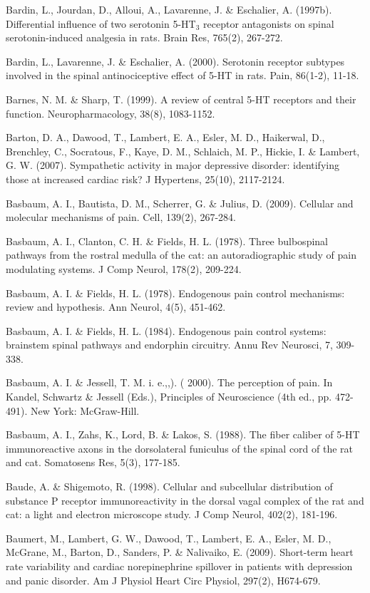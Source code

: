\documentclass[a4paper,12pt,twoside]{report}
\begin{document}
\begin{singlespacing}
\begin{footnotesize}
Bardin, L., Jourdan, D., Alloui, A., Lavarenne, J. \& Eschalier, A. (1997b). Differential influence of two serotonin 5-HT$_{3}$ receptor antagonists on spinal serotonin-induced analgesia in rats. Brain Res, 765(2), 267-272.

Bardin, L., Lavarenne, J. \& Eschalier, A. (2000). Serotonin receptor subtypes involved in the spinal antinociceptive effect of 5-HT in rats. Pain, 86(1-2), 11-18.

Barnes, N. M. \& Sharp, T. (1999). A review of central 5-HT receptors and their function. Neuropharmacology, 38(8), 1083-1152.

Barton, D. A., Dawood, T., Lambert, E. A., Esler, M. D., Haikerwal, D., Brenchley, C., Socratous, F., Kaye, D. M., Schlaich, M. P., Hickie, I. \& Lambert, G. W. (2007). Sympathetic activity in major depressive disorder: identifying those at increased cardiac risk? J Hypertens, 25(10), 2117-2124.

Basbaum, A. I., Bautista, D. M., Scherrer, G. \& Julius, D. (2009). Cellular and molecular mechanisms of pain. Cell, 139(2), 267-284.

Basbaum, A. I., Clanton, C. H. \& Fields, H. L. (1978). Three bulbospinal pathways from the rostral medulla of the cat: an autoradiographic study of pain modulating systems. J Comp Neurol, 178(2), 209-224.

Basbaum, A. I. \& Fields, H. L. (1978). Endogenous pain control mechanisms: review and hypothesis. Ann Neurol, 4(5), 451-462.

Basbaum, A. I. \& Fields, H. L. (1984). Endogenous pain control systems: brainstem spinal pathways and endorphin circuitry. Annu Rev Neurosci, 7, 309-338.

Basbaum, A. I. \& Jessell, T. M. i. e.,,). ( 2000). The perception of pain. In Kandel, Schwartz \& Jessell (Eds.), Principles of Neuroscience (4th ed., pp. 472-491). New York: McGraw-Hill.

Basbaum, A. I., Zahs, K., Lord, B. \& Lakos, S. (1988). The fiber caliber of 5-HT immunoreactive axons in the dorsolateral funiculus of the spinal cord of the rat and cat. Somatosens Res, 5(3), 177-185.

Baude, A. \& Shigemoto, R. (1998). Cellular and subcellular distribution of substance P receptor immunoreactivity in the dorsal vagal complex of the rat and cat: a light and electron microscope study. J Comp Neurol, 402(2), 181-196.

Baumert, M., Lambert, G. W., Dawood, T., Lambert, E. A., Esler, M. D., McGrane, M., Barton, D., Sanders, P. \& Nalivaiko, E. (2009). Short-term heart rate variability and cardiac norepinephrine spillover in patients with depression and panic disorder. Am J Physiol Heart Circ Physiol, 297(2), H674-679.


\end{footnotesize}
\end{singlespacing}
\end{document}
